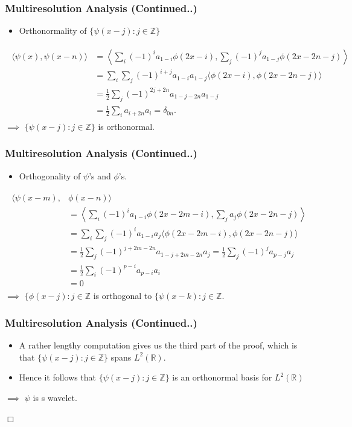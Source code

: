 \documentclass{beamer}
\newcommand{\qedwhite}{\hfill \ensuremath{\Box}}
\begin{document}
\begin{frame}
    \frametitle{Multiresolution Analysis (Continued..)}
\begin{itemize}
    \item Orthonormality of $\{\psi(x-j) : j \in  \mathbb{Z}\}$ 
\end{itemize}
\begin{eqnarray*}
    \begin{split}
        \langle \psi(x), \psi(x-n)\rangle &= \left\langle \sum_i (-1)^i a_{1-i}\phi(2x-i),  \sum_j (-1)^ja_{1-j}\phi(2x-2n-j) \right\rangle \\
        &= \sum_i\sum_j (-1)^{i+j}a_{1-i}a_{1-j} \langle \phi(2x-i), \phi(2x-2n-j)\rangle\\
        &= \frac{1}{2} \sum_j  (-1)^{2j+2n}a_{1-j-2n}a_{1-j}\\
        &= \frac{1}{2} \sum_i a_{i+2n}a_i = \delta_{0n}.
    \end{split}
\end{eqnarray*}
$\implies$ $\{\psi(x-j) : j \in  \mathbb{Z}\}$ is orthonormal.
\end{frame}

\begin{frame}
    \frametitle{Multiresolution Analysis (Continued..)}
\begin{itemize}
    \item Orthogonality of $\psi$'s and $\phi$'s.
\end{itemize}
\begin{eqnarray*}
    \begin{split}
        \langle \psi(x-m), & \phi(x-n)\rangle \\
        &= \left\langle \sum_i (-1)^i a_{1-i}\phi(2x-2m-i),  \sum_j a_j\phi(2x-2n-j) \right\rangle \\
        &= \sum_i\sum_j (-1)^{i}a_{1-i}a_j \langle \phi(2x-2m-i), \phi(2x-2n-j)\rangle\\
        &= \frac{1}{2} \sum_j  (-1)^{j+2m-2n}a_{1-j+2m-2n}a_j = \frac{1}{2} \sum_j  (-1)^{j}a_{p-j}a_j\\
        &= \frac{1}{2} \sum_i  (-1)^{p-i}a_{p-i}a_i\\
        &= 0
    \end{split}
\end{eqnarray*}
$\implies$ $\{\phi(x-j) : j \in  \mathbb{Z}$ is orthogonal to $\{\psi(x-k) : j \in  \mathbb{Z}$.
\end{frame}


\begin{frame}
    \frametitle{Multiresolution Analysis (Continued..)}
\begin{itemize}
    \item A rather lengthy computation gives us the third part of the proof, which is that $\{\psi(x-j) : j \in  \mathbb{Z}\}$ spans $L^2(\mathbb{R})$.
    \item Hence it follows that $\{\psi(x-j) : j \in  \mathbb{Z}\}$ is an orthonormal basis for $L^2(\mathbb{R})$
\end{itemize}

$\implies$ $\psi$  is s wavelet.

\qedwhite

\end{frame}
\end{document}
